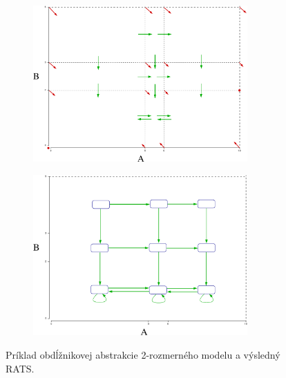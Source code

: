 \documentclass[11pt,final,oneside]{fithesis}
\begin{document}
\begin{figure}[h]
\centering
\begin{subfigure}{.5\textwidth}
	\centering
	\includegraphics[width=0.9\textwidth]{partition2.pdf}
\end{subfigure}%
\begin{subfigure}{.5\textwidth}
	\centering
	\includegraphics[width=0.9\textwidth]{partition3.pdf}
\end{subfigure}
\caption{Pr\'iklad obd\'l\v znikovej abstrakcie 2-rozmern\'eho modelu a v\'ysledn\'y RATS.}
\label{fig:rats}
\end{figure}
\end{document}
